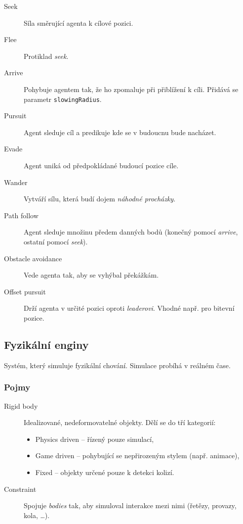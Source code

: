 \begin{description}
    \item[Seek] Síla směrující agenta k cílové pozici.
    \item[Flee] Protiklad \textit{seek}.
    \item[Arrive] Pohybuje agentem tak, že ho zpomaluje při přiblížení k cíli. Přidává se parametr \texttt{slowingRadius}.
    \item[Pursuit] Agent sleduje cíl a predikuje kde se v budoucnu bude nacházet.
    \item[Evade] Agent uniká od předpokládané budoucí pozice cíle.
    \item[Wander] Vytváří sílu, která budí dojem \textit{náhodné procházky}.
    \item[Path follow] Agent sleduje množinu předem danných bodů (konečný pomocí \textit{arrive}, ostatní pomocí \textit{seek}).
    \item[Obstacle avoidance] Vede agenta tak, aby se vyhýbal překážkám.
    \item[Offset pursuit] Drží agenta v určité pozici oproti \textit{leaderovi}. Vhodné např. pro bitevní pozice. 
\end{description}

\subsection*{Fyzikální enginy}

Systém, který simuluje fyzikální chování.
Simulace probíhá v reálném čase.


\subsubsection*{Pojmy}

\medskip

\begin{description}
    \item[Rigid body] Idealizované, nedeformovatelné objekty. Dělí se do tří kategorií:
        \begin{itemize}
            \item Physics driven -- řízený pouze simulací,
            \item Game driven -- pohybující se nepřirozeným stylem (např. animace),
            \item Fixed -- objekty určené pouze k detekci kolizí.
        \end{itemize}
    \item[Constraint] Spojuje \textit{bodies} tak, aby simuloval interakce mezi nimi (řetězy, provazy, kola, \dots).
\end{description}

